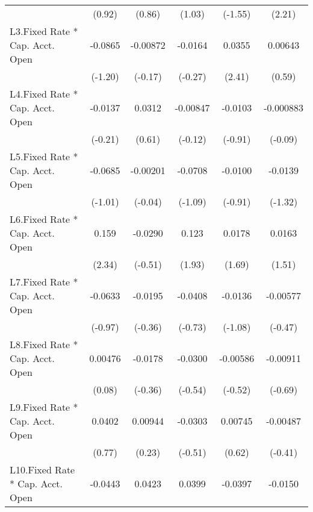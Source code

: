 {\begin{longtable}{l*{5}{c}}
                &   (0.92)         &   (0.86)         &   (1.03)         &  (-1.55)         &   (2.21)         \\
[1em]
L3.Fixed Rate * Cap. Acct. Open&  -0.0865         & -0.00872         &  -0.0164         &   0.0355\sym{*}  &  0.00643         \\
                &  (-1.20)         &  (-0.17)         &  (-0.27)         &   (2.41)         &   (0.59)         \\
[1em]
L4.Fixed Rate * Cap. Acct. Open&  -0.0137         &   0.0312         & -0.00847         &  -0.0103         &-0.000883         \\
                &  (-0.21)         &   (0.61)         &  (-0.12)         &  (-0.91)         &  (-0.09)         \\
[1em]
L5.Fixed Rate * Cap. Acct. Open&  -0.0685         & -0.00201         &  -0.0708         &  -0.0100         &  -0.0139         \\
                &  (-1.01)         &  (-0.04)         &  (-1.09)         &  (-0.91)         &  (-1.32)         \\
[1em]
L6.Fixed Rate * Cap. Acct. Open&    0.159\sym{*}  &  -0.0290         &    0.123         &   0.0178         &   0.0163         \\
                &   (2.34)         &  (-0.51)         &   (1.93)         &   (1.69)         &   (1.51)         \\
[1em]
L7.Fixed Rate * Cap. Acct. Open&  -0.0633         &  -0.0195         &  -0.0408         &  -0.0136         & -0.00577         \\
                &  (-0.97)         &  (-0.36)         &  (-0.73)         &  (-1.08)         &  (-0.47)         \\
[1em]
L8.Fixed Rate * Cap. Acct. Open&  0.00476         &  -0.0178         &  -0.0300         & -0.00586         & -0.00911         \\
                &   (0.08)         &  (-0.36)         &  (-0.54)         &  (-0.52)         &  (-0.69)         \\
[1em]
L9.Fixed Rate * Cap. Acct. Open&   0.0402         &  0.00944         &  -0.0303         &  0.00745         & -0.00487         \\
                &   (0.77)         &   (0.23)         &  (-0.51)         &   (0.62)         &  (-0.41)         \\
[1em]
L10.Fixed Rate * Cap. Acct. Open&  -0.0443         &   0.0423         &   0.0399         &  -0.0397\sym{**} &  -0.0150         \\

\end{longtable}}
